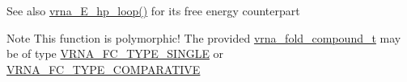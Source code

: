 \begin{DoxySeeAlso}{See also}
\hyperlink{group__eval__loops__hp_ga57179ea326cc5ed8dfe4d3962b233128}{vrna\+\_\+\+E\+\_\+hp\+\_\+loop()} for it\textquotesingle{}s free energy counterpart
\end{DoxySeeAlso}
\begin{DoxyNote}{Note}
This function is polymorphic! The provided \hyperlink{group__fold__compound_ga1b0cef17fd40466cef5968eaeeff6166}{vrna\+\_\+fold\+\_\+compound\+\_\+t} may be of type \hyperlink{group__fold__compound_gga01a4ff86fa71deaaa5d1abbd95a1447da7e264dd3cf2dc9b6448caabcb7763cd6}{V\+R\+N\+A\+\_\+\+F\+C\+\_\+\+T\+Y\+P\+E\+\_\+\+S\+I\+N\+G\+LE} or \hyperlink{group__fold__compound_gga01a4ff86fa71deaaa5d1abbd95a1447dab821ce46ea3cf665be97df22a76f5023}{V\+R\+N\+A\+\_\+\+F\+C\+\_\+\+T\+Y\+P\+E\+\_\+\+C\+O\+M\+P\+A\+R\+A\+T\+I\+VE} 
\end{DoxyNote}
